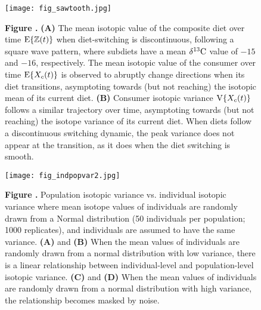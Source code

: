 \documentclass{frontiersSCNS}
\begin{document}
\begin{figure}[h!]
\begin{center}
\texttt{[image: fig\_sawtooth.jpg]}
\end{center}
\textbf{\label{figsawtooth} Figure .}{
{\bf(A)} The mean isotopic value of the composite diet over time ${\rm E}\{\mathbb{Z}(t)\}$ when diet-switching is discontinuous, following a square wave pattern, where subdiets have a mean $\delta^{13}{\rm C}$ value of $-15$ and $-16$, respectively.
The mean isotopic value of the consumer over time ${\rm E}\{X_c(t)\}$ is observed to abruptly change directions when its diet transitions, asymptoting towards (but not reaching) the isotopic mean of its current diet.
{\bf(B)} Consumer isotopic variance ${\rm V}\{X_c(t)\}$ follows a similar trajectory over time, asymptoting towards (but not reaching) the isotope variance of its current diet.
When diets follow a discontinuous switching dynamic, the peak variance does not appear at the transition, as it does when the diet switching is smooth.
}
\end{figure}


\begin{figure}[h!]
\begin{center}
\texttt{[image: fig\_indpopvar2.jpg]}
\end{center}
\textbf{\label{figindpopvar} Figure .}{
Population isotopic variance vs. individual isotopic variance where mean isotope values of individuals are randomly drawn from a Normal distribution (50 individuals per population; 1000 replicates), and individuals are assumed to have the same variance.
{\bf(A)} and {\bf(B)} When the mean values of individuals are randomly drawn from a normal distribution with low variance, there is a linear relationship between individual-level and population-level isotopic variance.
{\bf(C)} and {\bf(D)} When the mean values of individuals are randomly drawn from a normal distribution with high variance, the relationship becomes masked by noise.
}
\end{figure}
\end{document}
